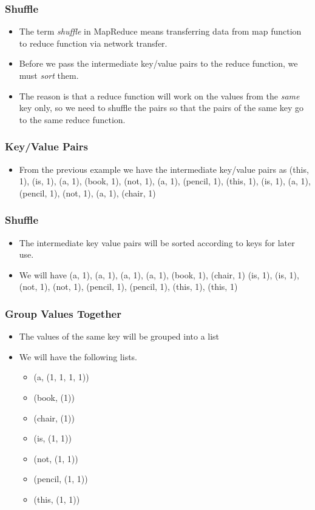 \documentclass{beamer}
\begin{document}
\begin{frame}
  \frametitle{Shuffle}
  \begin{itemize}
    \item The term {\em shuffle} in MapReduce means transferring data
      from map function to reduce function via network transfer.
    \item Before we pass the intermediate key/value pairs to the
      reduce function, we must {\em sort} them.
    \item The reason is that a reduce function will work on the values
      from the {\em same} key only, so we need to shuffle the pairs so
      that the pairs of the same key go to the same reduce function.
  \end{itemize}
\end{frame}

\begin{frame}
  \frametitle{Key/Value Pairs}
  \begin{itemize}
    \item From the previous example we have the intermediate key/value
      pairs as (this, 1), (is, 1), (a, 1), (book, 1), (not, 1),
      (a, 1), (pencil, 1), (this, 1), (is, 1), (a, 1), (pencil, 1),
      (not, 1), (a, 1), (chair, 1)
  \end{itemize}
\end{frame}

\begin{frame}
  \frametitle{Shuffle}
  \begin{itemize}
    \item The intermediate key value pairs will be sorted according to
      keys for later use.
    \item We will have (a, 1), (a, 1), (a, 1), (a, 1), (book, 1),
      (chair, 1) (is, 1), (is, 1), (not, 1), (not, 1), (pencil, 1),
      (pencil, 1), (this, 1), (this, 1)
  \end{itemize}
\end{frame}

\begin{frame}
  \frametitle{Group Values Together}
  \begin{itemize}
    \item The values of the same key will be grouped into a list
    \item We will have the following lists.
      \begin{itemize}
        \item (a, (1, 1, 1, 1))
        \item (book, (1))
        \item (chair, (1))
        \item (is, (1, 1))
        \item (not, (1, 1))
        \item (pencil, (1, 1))
        \item (this, (1, 1))
      \end{itemize}
  \end{itemize}
\end{frame}
\end{document}
